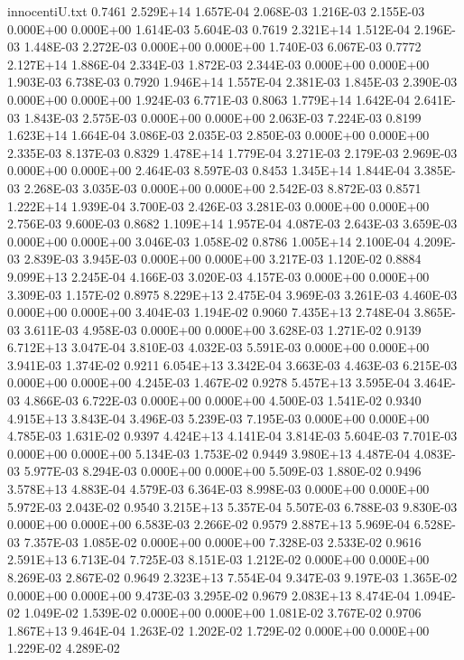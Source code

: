\begin{filecontents}{innocentiU.txt}
0.7461 2.529E+14 1.657E-04 2.068E-03 1.216E-03 2.155E-03 0.000E+00 0.000E+00 1.614E-03 5.604E-03
0.7619 2.321E+14 1.512E-04 2.196E-03 1.448E-03 2.272E-03 0.000E+00 0.000E+00 1.740E-03 6.067E-03
0.7772 2.127E+14 1.886E-04 2.334E-03 1.872E-03 2.344E-03 0.000E+00 0.000E+00 1.903E-03 6.738E-03
0.7920 1.946E+14 1.557E-04 2.381E-03 1.845E-03 2.390E-03 0.000E+00 0.000E+00 1.924E-03 6.771E-03
0.8063 1.779E+14 1.642E-04 2.641E-03 1.843E-03 2.575E-03 0.000E+00 0.000E+00 2.063E-03 7.224E-03
0.8199 1.623E+14 1.664E-04 3.086E-03 2.035E-03 2.850E-03 0.000E+00 0.000E+00 2.335E-03 8.137E-03
0.8329 1.478E+14 1.779E-04 3.271E-03 2.179E-03 2.969E-03 0.000E+00 0.000E+00 2.464E-03 8.597E-03
0.8453 1.345E+14 1.844E-04 3.385E-03 2.268E-03 3.035E-03 0.000E+00 0.000E+00 2.542E-03 8.872E-03
0.8571 1.222E+14 1.939E-04 3.700E-03 2.426E-03 3.281E-03 0.000E+00 0.000E+00 2.756E-03 9.600E-03
0.8682 1.109E+14 1.957E-04 4.087E-03 2.643E-03 3.659E-03 0.000E+00 0.000E+00 3.046E-03 1.058E-02
0.8786 1.005E+14 2.100E-04 4.209E-03 2.839E-03 3.945E-03 0.000E+00 0.000E+00 3.217E-03 1.120E-02
0.8884 9.099E+13 2.245E-04 4.166E-03 3.020E-03 4.157E-03 0.000E+00 0.000E+00 3.309E-03 1.157E-02
0.8975 8.229E+13 2.475E-04 3.969E-03 3.261E-03 4.460E-03 0.000E+00 0.000E+00 3.404E-03 1.194E-02
0.9060 7.435E+13 2.748E-04 3.865E-03 3.611E-03 4.958E-03 0.000E+00 0.000E+00 3.628E-03 1.271E-02
0.9139 6.712E+13 3.047E-04 3.810E-03 4.032E-03 5.591E-03 0.000E+00 0.000E+00 3.941E-03 1.374E-02
0.9211 6.054E+13 3.342E-04 3.663E-03 4.463E-03 6.215E-03 0.000E+00 0.000E+00 4.245E-03 1.467E-02
0.9278 5.457E+13 3.595E-04 3.464E-03 4.866E-03 6.722E-03 0.000E+00 0.000E+00 4.500E-03 1.541E-02
0.9340 4.915E+13 3.843E-04 3.496E-03 5.239E-03 7.195E-03 0.000E+00 0.000E+00 4.785E-03 1.631E-02
0.9397 4.424E+13 4.141E-04 3.814E-03 5.604E-03 7.701E-03 0.000E+00 0.000E+00 5.134E-03 1.753E-02
0.9449 3.980E+13 4.487E-04 4.083E-03 5.977E-03 8.294E-03 0.000E+00 0.000E+00 5.509E-03 1.880E-02
0.9496 3.578E+13 4.883E-04 4.579E-03 6.364E-03 8.998E-03 0.000E+00 0.000E+00 5.972E-03 2.043E-02
0.9540 3.215E+13 5.357E-04 5.507E-03 6.788E-03 9.830E-03 0.000E+00 0.000E+00 6.583E-03 2.266E-02
0.9579 2.887E+13 5.969E-04 6.528E-03 7.357E-03 1.085E-02 0.000E+00 0.000E+00 7.328E-03 2.533E-02
0.9616 2.591E+13 6.713E-04 7.725E-03 8.151E-03 1.212E-02 0.000E+00 0.000E+00 8.269E-03 2.867E-02
0.9649 2.323E+13 7.554E-04 9.347E-03 9.197E-03 1.365E-02 0.000E+00 0.000E+00 9.473E-03 3.295E-02
0.9679 2.083E+13 8.474E-04 1.094E-02 1.049E-02 1.539E-02 0.000E+00 0.000E+00 1.081E-02 3.767E-02
0.9706 1.867E+13 9.464E-04 1.263E-02 1.202E-02 1.729E-02 0.000E+00 0.000E+00 1.229E-02 4.289E-02

\end{filecontents}
